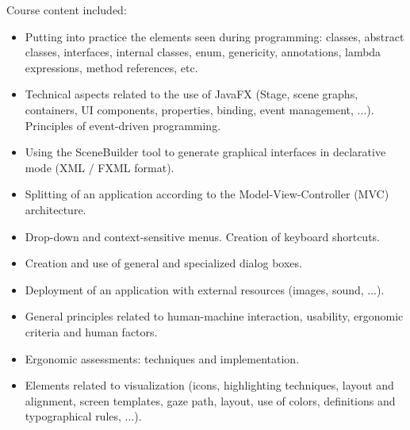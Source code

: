 Course content included:
\begin{itemize}
    \item Putting into practice the elements seen during programming: classes, abstract classes, interfaces, internal classes, enum, genericity, annotations, lambda expressions, method references, etc.
    \item Technical aspects related to the use of JavaFX (Stage, scene graphs, containers, UI components, properties, binding, event management, ...). Principles of event-driven programming.
    \item Using the SceneBuilder tool to generate graphical interfaces in declarative mode (XML / FXML format).
    \item Splitting of an application according to the Model-View-Controller (MVC) architecture.
    \item Drop-down and context-sensitive menus. Creation of keyboard shortcuts.
    \item Creation and use of general and specialized dialog boxes.
    \item Deployment of an application with external resources (images, sound, ...).
    \item General principles related to human-machine interaction, usability, ergonomic criteria and human factors.
    \item Ergonomic assessments: techniques and implementation.
    \item Elements related to visualization (icons, highlighting techniques, layout and alignment, screen templates, gaze path, layout, use of colors, definitions and typographical rules, ...).
\end{itemize}